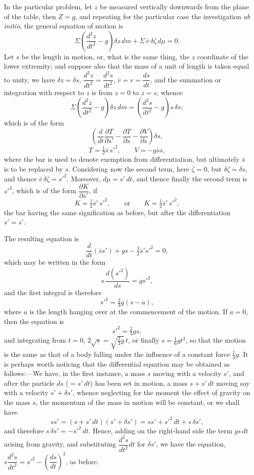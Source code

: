 \documentclass[11pt,a4paper]{book}
\begin{document}
In the particular problem, let $z$ be measured vertically downwards from the plane of the table, then $Z=g$, and repeating for the particular case the investigation \textit{ab initio}, the general equation of motion is
\[
\Sigma\left(\frac{d^2z}{dt^2}-g\right)\delta z\,dm+\Sigma\,\bar{v}\,\delta\zeta\,d\mu=0.
\]
Let $s$ be the length in motion, or, what is the same thing, the $z$ coordinate of the lower extremity; and suppose also that the mass of a unit of length is taken equal to unity, we have $\delta z=\delta s$, $\dfrac{d^2z}{dt^2}=\dfrac{d^2s}{dt^2}$, $\bar{v}=v=\dfrac{ds}{dt}$, and the summation or integration with respect to $z$ is from $z=0$ to $z=s$, whence
\[
\Sigma\left(\frac{d^2z}{dt^2}-g\right)\delta z\,dm
=\left(\frac{d^2s}{dt^2}-g\right)s\,\delta s;
\]
which is of the form
\[
\left(\frac{d}{dt}\frac{\partial T}{\partial s'}-\frac{\partial T}{\partial s}-\frac{\partial V}{\partial s}\right)\delta s,
\]
\[
T=\tfrac{1}{2}\bar{s}\,s'^2,\qquad V=-g\bar{s}s,
\]
where the bar is used to denote exemption from differentiation, but ultimately $\bar{s}$ is to be replaced by $s$. Considering now the second term, here $\bar{\zeta}=0$, but $\delta\zeta=\delta s$, and thence $\bar{v}\,\delta\zeta=s'^2$. Moreover, $d\mu=s'\,dt$, and thence finally the second term is $s'^3$, which is of the form $\dfrac{\partial K}{\partial s'}$, if
\[
K=\tfrac{1}{2}\bar{s}'\,s'^2,\qquad \text{or}\qquad K=\tfrac{1}{2}\bar{s}'\,s'^2,
\]
the bar having the same signification as before, but after the differentiation $s'=s'$.

The resulting equation is
\[
\frac{d}{dt}(\bar{s}s')+gs-\tfrac{3}{2}\bar{s}'s'^2=0,
\]
which may be written in the form
\[
s\,\frac{d(s'^2)}{ds}=gs'^2,
\]
and the first integral is therefore
\[
s'^2=\tfrac{2}{3}g(s-a),
\]
where $a$ is the length hanging over at the commencement of the motion. If $a=0$, then the equation is
\[
s'^2=\tfrac{2}{3}gs,
\]
and integrating from $t=0$, $2\sqrt{s}=\sqrt{\tfrac{2}{3}g}\,t$, or finally $s=\tfrac{1}{6}gt^2$, so that the motion is the same as that of a body falling under the influence of a constant force $\tfrac{1}{3}g$. It is perhaps worth noticing that the differential equation may be obtained as follows:---We have, in the first instance, a mass $s$ moving with a velocity $s'$, and after the particle $ds$ ($=s'\,dt$) has been set in motion, a mass $s+s'\,dt$ moving say with a velocity $s'+\delta s'$, whence neglecting for the moment the effect of gravity on the mass $s$, the momentum of the mass in motion will be constant, or we shall have
\[
ss'=(s+s'\,dt)(s'+\delta s')=ss'+s'^2\,dt+s\,\delta s',
\]
and therefore $s\,\delta s'=-s'^2\,dt$. Hence, adding on the right-hand side the term $gs\,dt$ arising from gravity, and substituting $\dfrac{d^2s}{dt^2}dt$ for $\delta s'$, we have the equation, $s\dfrac{d^2s}{dt^2}=s'^2-\left(\dfrac{ds}{dt}\right)^2$, as before.
\newpage
\end{document}
